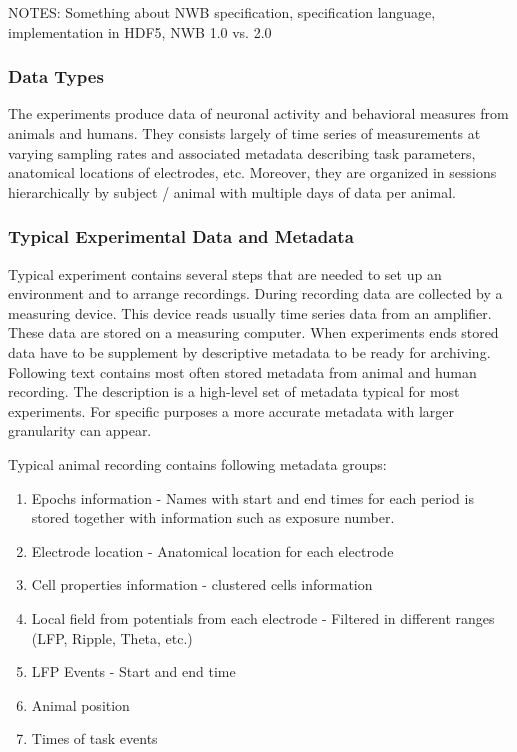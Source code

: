 \documentclass[utf8]{frontiersSCNS} %
\begin{document}
NOTES: Something about NWB specification, specification language, implementation in HDF5, NWB 1.0 vs. 2.0


\subsubsection{Data Types}
\label{data-types}

The experiments produce data of neuronal activity and behavioral measures from animals and humans. They consists largely of time series of measurements at varying sampling rates and associated metadata describing task parameters, anatomical locations of electrodes, etc. Moreover, they are organized in sessions hierarchically by subject / animal with multiple days of data per animal.

\subsubsection{Typical Experimental Data and Metadata}
\label{typical-data-analysis-steps}

Typical experiment contains several steps that are needed to set up an environment and to arrange recordings. During recording data are collected by a measuring device. This device reads usually time series data from an amplifier. These data are stored on a measuring computer. When experiments ends stored data have to be supplement by descriptive metadata to be ready for archiving. Following text contains most often stored metadata from animal and human recording. The description is a high-level set of metadata typical for most experiments. For specific purposes a more accurate metadata with larger granularity can appear.

Typical animal recording contains following metadata groups:

\begin{enumerate}
 \item Epochs information - Names with start and end times for each period is stored together with information such as exposure number. 
 \item Electrode location - Anatomical location for each electrode
 \item Cell properties information - clustered cells information
 \item Local field from potentials from each electrode - Filtered in different ranges (LFP, Ripple, Theta, etc.)
 \item LFP Events - Start and end time
 \item Animal position
 \item Times of task events
\end{enumerate}
\end{document}
